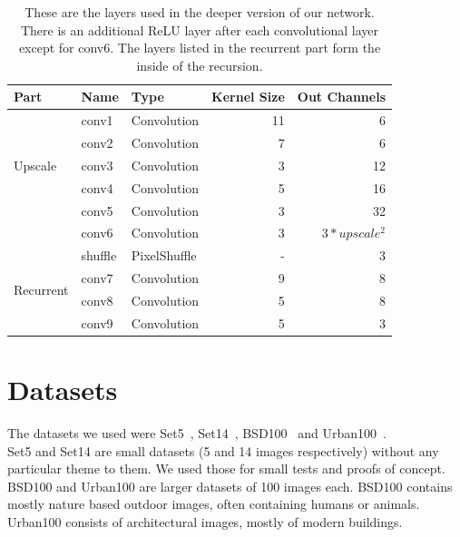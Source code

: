 \documentclass[11pt]{article}
\begin{document}
\begin{table}[h!]
    \renewcommand{\arraystretch}{1.5}
    \centering
    \begin{tabular}{ |l|l|l|r|r| }
        \hline
        \textbf{Part} & \textbf{Name} & \textbf{Type} & \textbf{Kernel Size} & \textbf{Out Channels} \\
        \hline
        \multirow{5}{*}{Upscale} & conv1 & Convolution & 11 & 6 \\
        \cline{2-5}
        & conv2 & Convolution & 7 & 6 \\
        \cline{2-5}
        & conv3 & Convolution & 3 & 12 \\
        \cline{2-5}
        & conv4 & Convolution & 5 & 16 \\
        \cline{2-5}
        & conv5 & Convolution & 3 & 32 \\
        \cline{2-5}
        & conv6 & Convolution & 3 & $3*upscale^2$ \\
        \cline{2-5}
        & shuffle & PixelShuffle & - & 3\\
        \hline
        \multirow{2}{*}{Recurrent} & conv7 & Convolution & 9 & 8 \\
        \cline{2-5}
        & conv8 & Convolution & 5 & 8 \\
        \cline{2-5}
        & conv9 & Convolution & 5 & 3 \\
        \hline
    \end{tabular}
    \caption{These are the layers used in the deeper version of our network. There is an additional ReLU layer after each convolutional layer except for conv6. The layers listed in the recurrent part form the inside of the recursion.}
    \label{table:main_architecture_deep}
\end{table}



\section{Datasets}

The datasets we used were Set5~\cite{set5}, Set14~\cite{set14}, BSD100~\cite{BSD100} and Urban100~\cite{Urban100}.\\
Set5 and Set14 are small datasets (5 and 14 images respectively) without any particular theme to them. We used those for small tests and proofs of concept.\\
BSD100 and Urban100 are larger datasets of 100 images each. BSD100 contains mostly nature based outdoor images, often containing humans or animals. Urban100 consists of architectural images, mostly of modern buildings.
\end{document}
